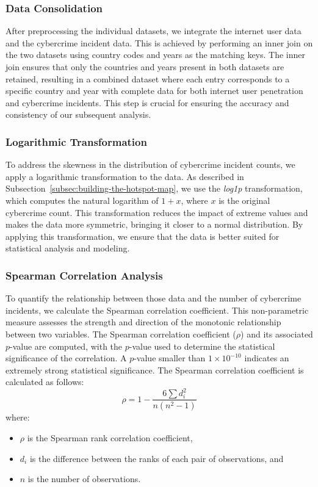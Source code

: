     \subsubsection{Data Consolidation} %
        After preprocessing the individual datasets, we integrate the internet user data and the cybercrime incident data.
        This is achieved by performing an inner join on the two datasets using country codes and years as the matching keys.
        The inner join ensures that only the countries and years present in both datasets are retained,
        resulting in a combined dataset where each entry corresponds to a specific country and year with complete data
        for both internet user penetration and cybercrime incidents.
        This step is crucial for ensuring the accuracy and consistency of our subsequent analysis.

    \subsubsection{Logarithmic Transformation} %
        To address the skewness in the distribution of cybercrime incident counts,
        we apply a logarithmic transformation to the data.
        As described in Subsection~\ref{subsec:building-the-hotspot-map},
        we use the \textit{log1p} transformation, which computes the natural logarithm of \(1 + x\),
        where \(x\) is the original cybercrime count.
        This transformation reduces the impact of extreme values and makes the data more symmetric,
        bringing it closer to a normal distribution.
        By applying this transformation, we ensure that the data is better suited for statistical analysis and modeling.

    \subsubsection{Spearman Correlation Analysis} %
        To quantify the relationship between those data and the number of cybercrime incidents,
        we calculate the Spearman correlation coefficient.
        This non-parametric measure assesses the strength and direction of the monotonic relationship between two variables.
        The Spearman correlation coefficient (\(\rho\)) and its associated \(p\)-value are computed,
        with the \(p\)-value used to determine the statistical significance of the correlation.
        A \(p\)-value smaller than \(1 \times 10^{-10}\) indicates an extremely strong statistical significance.
        The Spearman correlation coefficient is calculated as follows:
        \begin{equation}
            \rho = 1 - \frac{6 \sum d_i^2}{n(n^2 - 1)}\label{eq:5-2-3-1}
        \end{equation}
        where:
        \begin{itemize}
            \item \(\rho\) is the Spearman rank correlation coefficient,
            \item \(d_i\) is the difference between the ranks of each pair of observations, and
            \item \(n\) is the number of observations.
        \end{itemize}


